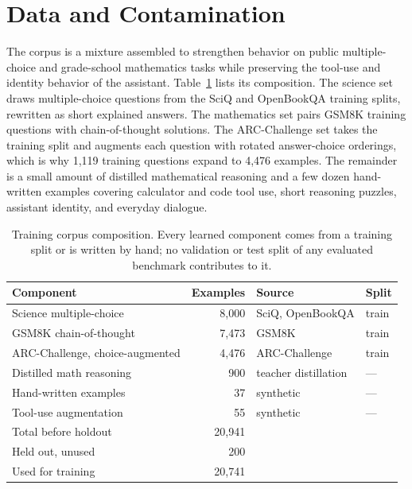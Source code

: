 \section{Data and Contamination}
\label{sec:data}

The corpus is a mixture assembled to strengthen behavior on public multiple-choice and grade-school mathematics tasks while preserving the tool-use and identity behavior of the assistant. Table~\ref{tab:data} lists its composition. The science set draws multiple-choice questions from the SciQ \citep{welbl2017sciq} and OpenBookQA \citep{mihaylov2018openbookqa} training splits, rewritten as short explained answers. The mathematics set pairs GSM8K training questions \citep{cobbe2021gsm8k} with chain-of-thought solutions. The ARC-Challenge set takes the training split \citep{clark2018arc} and augments each question with rotated answer-choice orderings, which is why 1{,}119 training questions expand to 4{,}476 examples. The remainder is a small amount of distilled mathematical reasoning and a few dozen hand-written examples covering calculator and code tool use, short reasoning puzzles, assistant identity, and everyday dialogue.

\begin{table}[t]
\centering
\caption{Training corpus composition. Every learned component comes from a training split or is written by hand; no validation or test split of any evaluated benchmark contributes to it.}
\label{tab:data}
\begin{tabular}{lrll}
\toprule
Component & Examples & Source & Split \\
\midrule
Science multiple-choice & 8{,}000 & SciQ, OpenBookQA & train \\
GSM8K chain-of-thought & 7{,}473 & GSM8K & train \\
ARC-Challenge, choice-augmented & 4{,}476 & ARC-Challenge & train \\
Distilled math reasoning & 900 & teacher distillation & --- \\
Hand-written examples & 37 & synthetic & --- \\
Tool-use augmentation & 55 & synthetic & --- \\
\midrule
Total before holdout & 20{,}941 & & \\
Held out, unused & 200 & & \\
Used for training & 20{,}741 & & \\
\bottomrule
\end{tabular}
\end{table}


